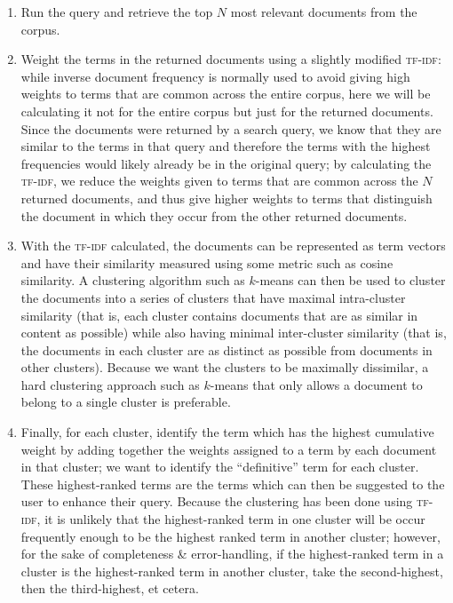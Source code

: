 \documentclass[a4paper]{article}
\begin{document}
\begin{enumerate}
    \item   Run the query and retrieve the top $N$ most relevant documents from the corpus.

    \item   Weight the terms in the returned documents using a slightly modified \textsc{tf-idf}:
            while inverse document frequency is normally used to avoid giving high weights to terms that are common across the entire corpus, here we will be calculating it not for the entire corpus but just for the returned documents.
            Since the documents were returned by a search query, we know that they are similar to the terms in that query and therefore the terms with the highest frequencies would likely already be in the original query;
            by calculating the \textsc{tf-idf}, we reduce the weights given to terms that are common across the $N$ returned documents, and thus give higher weights to terms that distinguish the document in which they occur from the other returned documents.

    \item   With the \textsc{tf-idf} calculated, the documents can be represented as term vectors and have their similarity measured using some metric such as cosine similarity.
            A clustering algorithm such as $k$-means can then be used to cluster the documents into a series of clusters that have maximal intra-cluster similarity (that is, each cluster contains documents that are as similar in content as possible)  while also having minimal inter-cluster similarity (that is, the documents in each cluster are as distinct as possible from documents in other clusters).
            Because we want the clusters to be maximally dissimilar, a hard clustering approach such as $k$-means that only allows a document to belong to a single cluster is preferable.

    \item   Finally, for each cluster, identify the term which has the highest cumulative weight by adding together the weights assigned to a term by each document in that cluster;
            we want to identify the ``definitive'' term for each cluster.
            These highest-ranked terms are the terms which can then be suggested to the user to enhance their query.
            Because the clustering has been done using \textsc{tf-idf}, it is unlikely that the highest-ranked term in one cluster will be occur frequently enough to be the highest ranked term in another cluster; however, for the sake of completeness \& error-handling, if the highest-ranked term in a cluster is the highest-ranked term in another cluster, take the second-highest, then the third-highest, et cetera.
\end{enumerate}
\end{document}
